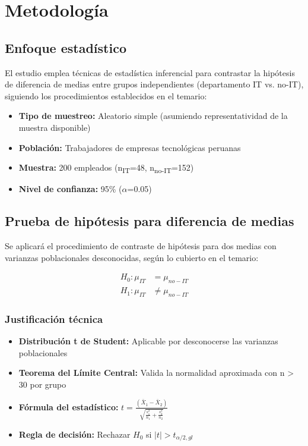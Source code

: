 \section{Metodología}

	\subsection{Enfoque estadístico}
	El estudio emplea técnicas de estadística inferencial para contrastar la hipótesis de diferencia de medias entre grupos independientes (departamento IT vs. no-IT), siguiendo los procedimientos establecidos en el temario:

	\begin{itemize}
		\item \textbf{Tipo de muestreo:} Aleatorio simple (asumiendo representatividad de la muestra disponible)
		\item \textbf{Población:} Trabajadores de empresas tecnológicas peruanas
		\item \textbf{Muestra:} 200 empleados (n\textsubscript{IT}=48, n\textsubscript{no-IT}=152)
		\item \textbf{Nivel de confianza:} 95\% ($\alpha$=0.05)
	\end{itemize}

	\subsection{Prueba de hipótesis para diferencia de medias}
	Se aplicará el procedimiento de contraste de hipótesis para dos medias con varianzas poblacionales desconocidas, según lo cubierto en el temario:

	\begin{align*}
		H_0: \mu_{IT} &= \mu_{no-IT} \\
		H_1: \mu_{IT} &\neq \mu_{no-IT}
	\end{align*}

		\subsubsection*{Justificación técnica}
		\begin{itemize}
			\item \textbf{Distribución t de Student:} Aplicable por desconocerse las varianzas poblacionales
			\item \textbf{Teorema del Límite Central:} Valida la normalidad aproximada con n > 30 por grupo
			\item \textbf{Fórmula del estadístico:} 
			$t = \frac{(\bar{X}_1 - \bar{X}_2)}{\sqrt{\frac{s_1^2}{n_1} + \frac{s_2^2}{n_2}}}$
			\item \textbf{Regla de decisión:} Rechazar $H_0$ si $|t| > t_{\alpha/2, gl}$
		\end{itemize}

